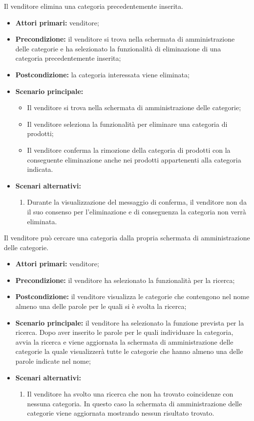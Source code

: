 Il venditore elimina una categoria precedentemente inserita.
\begin{itemize}
    \item \textbf{Attori primari:} venditore;
    \item \textbf{Precondizione:} il venditore si trova nella schermata di amministrazione delle categorie e ha selezionato la funzionalità di eliminazione di una categoria precedentemente inserita;
    \item \textbf{Postcondizione:} la categoria interessata viene eliminata;
    \item \textbf{Scenario principale:}
    \begin{itemize}
    	\item Il venditore si trova nella schermata di amministrazione delle categorie;
    	\item Il venditore seleziona la funzionalità per eliminare una categoria di prodotti;
    	\item Il venditore conferma la rimozione della categoria di prodotti con la conseguente eliminazione anche nei prodotti appartenenti alla categoria indicata.
    \end{itemize}
    \item \textbf{Scenari alternativi:}
    \begin{enumerate}[label=\lett]
    	\item Durante la visualizzazione del messaggio di conferma, il venditore non da il suo consenso per l'eliminazione e di conseguenza la categoria non verrà eliminata.
    \end{enumerate}
\end{itemize}

Il venditore può cercare una categoria dalla propria schermata di amministrazione delle categorie.
\begin{itemize}
	\item \textbf{Attori primari:} venditore;
	\item \textbf{Precondizione:} il venditore ha selezionato la funzionalità per la ricerca;
	\item \textbf{Postcondizione:} il venditore visualizza le categorie che contengono nel nome almeno una delle parole per le quali si è svolta la ricerca;
	\item \textbf{Scenario principale:} il venditore ha selezionato la funzione prevista per la ricerca. Dopo aver inserito le parole per le quali individuare la categoria, avvia la ricerca e viene aggiornata la schermata di amministrazione delle categorie la quale visualizzerà tutte le categorie che hanno almeno una delle parole indicate nel nome;
	\item \textbf{Scenari alternativi:}
	\begin{enumerate}[label=\lett]
		\item Il venditore ha svolto una ricerca che non ha trovato coincidenze con nessuna categoria. In questo caso la schermata di amministrazione delle categorie viene aggiornata mostrando nessun risultato trovato.
	\end{enumerate}
\end{itemize}
